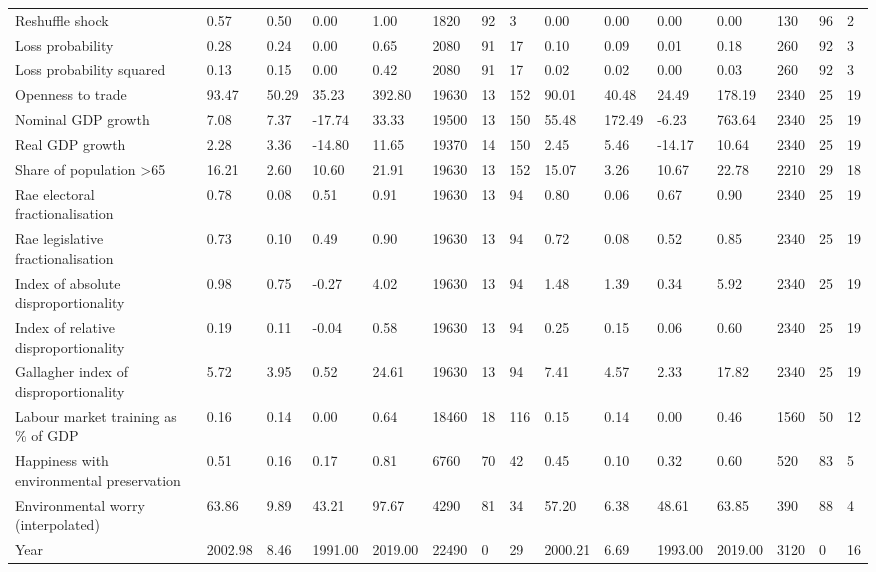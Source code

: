 \begin{longtable}{lllllllllllllll}
Reshuffle shock & 0.57 & 0.50 & 0.00 & 1.00 & 1820 & 92 & 3 & 0.00 & 0.00 & 0.00 & 0.00 & 130 & 96 & 2\\
\addlinespace
Loss probability & 0.28 & 0.24 & 0.00 & 0.65 & 2080 & 91 & 17 & 0.10 & 0.09 & 0.01 & 0.18 & 260 & 92 & 3\\
Loss probability squared & 0.13 & 0.15 & 0.00 & 0.42 & 2080 & 91 & 17 & 0.02 & 0.02 & 0.00 & 0.03 & 260 & 92 & 3\\
Openness to trade & 93.47 & 50.29 & 35.23 & 392.80 & 19630 & 13 & 152 & 90.01 & 40.48 & 24.49 & 178.19 & 2340 & 25 & 19\\
Nominal GDP growth & 7.08 & 7.37 & -17.74 & 33.33 & 19500 & 13 & 150 & 55.48 & 172.49 & -6.23 & 763.64 & 2340 & 25 & 19\\
Real GDP growth & 2.28 & 3.36 & -14.80 & 11.65 & 19370 & 14 & 150 & 2.45 & 5.46 & -14.17 & 10.64 & 2340 & 25 & 19\\
\addlinespace
Share of population >65 & 16.21 & 2.60 & 10.60 & 21.91 & 19630 & 13 & 152 & 15.07 & 3.26 & 10.67 & 22.78 & 2210 & 29 & 18\\
Rae electoral fractionalisation & 0.78 & 0.08 & 0.51 & 0.91 & 19630 & 13 & 94 & 0.80 & 0.06 & 0.67 & 0.90 & 2340 & 25 & 19\\
Rae legislative fractionalisation & 0.73 & 0.10 & 0.49 & 0.90 & 19630 & 13 & 94 & 0.72 & 0.08 & 0.52 & 0.85 & 2340 & 25 & 19\\
Index of absolute disproportionality & 0.98 & 0.75 & -0.27 & 4.02 & 19630 & 13 & 94 & 1.48 & 1.39 & 0.34 & 5.92 & 2340 & 25 & 19\\
Index of relative disproportionality & 0.19 & 0.11 & -0.04 & 0.58 & 19630 & 13 & 94 & 0.25 & 0.15 & 0.06 & 0.60 & 2340 & 25 & 19\\
\addlinespace
Gallagher index of disproportionality & 5.72 & 3.95 & 0.52 & 24.61 & 19630 & 13 & 94 & 7.41 & 4.57 & 2.33 & 17.82 & 2340 & 25 & 19\\
Labour market training as \% of GDP & 0.16 & 0.14 & 0.00 & 0.64 & 18460 & 18 & 116 & 0.15 & 0.14 & 0.00 & 0.46 & 1560 & 50 & 12\\
Happiness with environmental preservation & 0.51 & 0.16 & 0.17 & 0.81 & 6760 & 70 & 42 & 0.45 & 0.10 & 0.32 & 0.60 & 520 & 83 & 5\\
Environmental worry (interpolated) & 63.86 & 9.89 & 43.21 & 97.67 & 4290 & 81 & 34 & 57.20 & 6.38 & 48.61 & 63.85 & 390 & 88 & 4\\
Year & 2002.98 & 8.46 & 1991.00 & 2019.00 & 22490 & 0 & 29 & 2000.21 & 6.69 & 1993.00 & 2019.00 & 3120 & 0 & 16\\
\bottomrule
\end{longtable}
